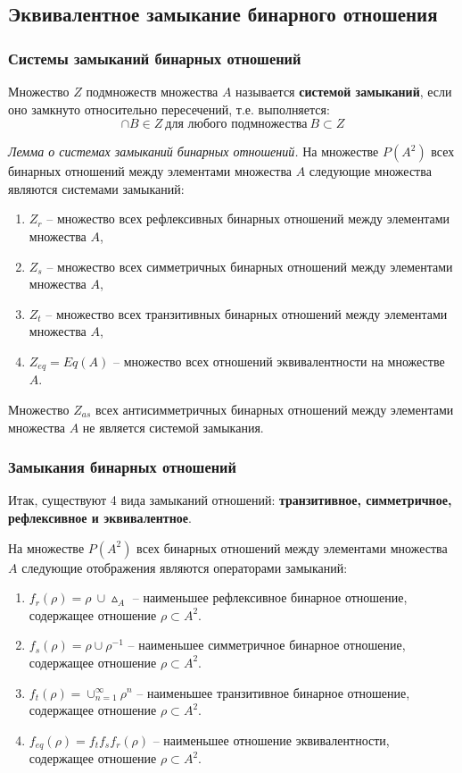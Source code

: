 \documentclass[bachelor, och, labwork]{shiza}
\begin{document}
\subsection{Эквивалентное замыкание бинарного отношения}

\subsubsection{Системы замыканий бинарных отношений}

Множество $Z$ подмножеств множества $A$ называется \textbf{системой замыканий}, 
если оно замкнуто относительно пересечений, т.е. выполняется: \[\cap B \in Z ~\text{для любого подмножества}~ B \subset Z \]


\textit{Лемма о системах замыканий бинарных отношений.} На множестве $P(A^2)$ всех 
бинарных отношений между элементами множества $A$ следующие множества являются системами замыканий:

\begin{enumerate}
    \item $Z_r$ -- множество всех рефлексивных бинарных отношений между элементами множества $A$,
    \item $Z_s$ -- множество всех симметричных бинарных отношений между элементами множества $A$,
    \item $Z_t$ -- множество всех транзитивных бинарных отношений между элементами множества $A$,
    \item $Z_{eq} = Eq(A)$ -- множество всех отношений эквивалентности на множестве $A$.
\end{enumerate}

Множество $Z_{as}$ всех антисимметричных бинарных отношений между элементами множества $A$ не является системой замыкания.

\subsubsection{Замыкания бинарных отношений}
Итак, существуют 4 вида замыканий отношений: \textbf{транзитивное, симметричное, 
рефлексивное и эквивалентное}.

На множестве $P(A^2)$ всех бинарных отношений между элементами множества $A$ 
следующие отображения являются операторами замыканий:
\begin{enumerate}
    \item $f_r(\rho) = \rho ~\cup \vartriangle_A$ -- наименьшее рефлексивное
    бинарное отношение, содержащее отношение $\rho \subset A^2$. 
    \item $f_s(\rho) = \rho \cup \rho^{-1}$ -- наименьшее симметричное
    бинарное отношение, содержащее отношение $\rho \subset A^2$.
    \item $f_t(\rho) = \cup^{\infty}_{n=1} \rho^n$ -- наименьшее транзитивное
    бинарное отношение, содержащее отношение $\rho \subset A^2$.
    \item $f_{eq}(\rho) = f_tf_sf_r(\rho)$ -- наименьшее отношение эквивалентности,
    содержащее отношение $\rho \subset A^2$.
\end{enumerate}
\end{document}
